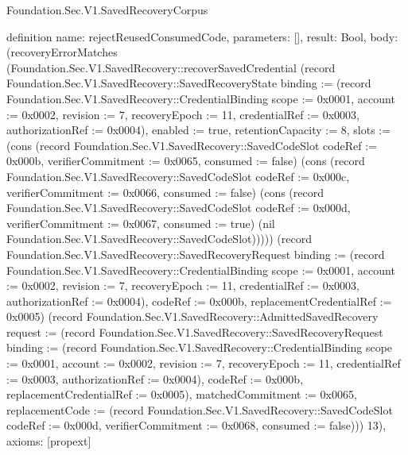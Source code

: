 \begin{lexlean}{Foundation.Sec.V1.SavedRecoveryCorpus}
\begin{semanticmodule}
definition{
  name: rejectReusedConsumedCode,
  parameters: [],
  result: Bool,
  body: (recoveryErrorMatches (Foundation.Sec.V1.SavedRecovery::recoverSavedCredential (record Foundation.Sec.V1.SavedRecovery::SavedRecoveryState {binding := (record Foundation.Sec.V1.SavedRecovery::CredentialBinding {scope := 0x0001, account := 0x0002, revision := 7, recoveryEpoch := 11, credentialRef := 0x0003, authorizationRef := 0x0004}), enabled := true, retentionCapacity := 8, slots := (cons (record Foundation.Sec.V1.SavedRecovery::SavedCodeSlot {codeRef := 0x000b, verifierCommitment := 0x0065, consumed := false}) (cons (record Foundation.Sec.V1.SavedRecovery::SavedCodeSlot {codeRef := 0x000c, verifierCommitment := 0x0066, consumed := false}) (cons (record Foundation.Sec.V1.SavedRecovery::SavedCodeSlot {codeRef := 0x000d, verifierCommitment := 0x0067, consumed := true}) (nil Foundation.Sec.V1.SavedRecovery::SavedCodeSlot))))}) (record Foundation.Sec.V1.SavedRecovery::SavedRecoveryRequest {binding := (record Foundation.Sec.V1.SavedRecovery::CredentialBinding {scope := 0x0001, account := 0x0002, revision := 7, recoveryEpoch := 11, credentialRef := 0x0003, authorizationRef := 0x0004}), codeRef := 0x000b, replacementCredentialRef := 0x0005}) (record Foundation.Sec.V1.SavedRecovery::AdmittedSavedRecovery {request := (record Foundation.Sec.V1.SavedRecovery::SavedRecoveryRequest {binding := (record Foundation.Sec.V1.SavedRecovery::CredentialBinding {scope := 0x0001, account := 0x0002, revision := 7, recoveryEpoch := 11, credentialRef := 0x0003, authorizationRef := 0x0004}), codeRef := 0x000b, replacementCredentialRef := 0x0005}), matchedCommitment := 0x0065, replacementCode := (record Foundation.Sec.V1.SavedRecovery::SavedCodeSlot {codeRef := 0x000d, verifierCommitment := 0x0068, consumed := false})})) 13),
  axioms: [propext]
}


\end{semanticmodule}
\end{lexlean}
